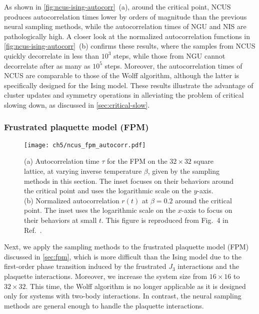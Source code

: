 As shown in \cref{fig:ncus-ising-autocorr}~(a), around the critical point, NCUS produces autocorrelation times lower by orders of magnitude than the previous neural sampling methods, while the autocorrelation times of NGU and NIS are pathologically high. A closer look at the normalized autocorrelation functions in \cref{fig:ncus-ising-autocorr}~(b) confirms these results, where the samples from NCUS quickly decorrelate in less than $10^3$ steps, while those from NGU cannot decorrelate after as many as $10^5$ steps. Moreover, the autocorrelation times of NCUS are comparable to those of the Wolff algorithm, although the latter is specifically designed for the Ising model. These results illustrate the advantage of cluster updates and symmetry operations in alleviating the problem of critical slowing down, as discussed in \cref{sec:critical-slow}.

\subsubsection{Frustrated plaquette model (FPM)}
\label{sec:ncus-fpm}

\begin{figure}[htb]
\centering
\texttt{[image: ch5/ncus\_fpm\_autocorr.pdf]}
\caption[NCUS results of FPM]{
(a) Autocorrelation time $\tau$ for the FPM on the $32 \times 32$ square lattice, at varying inverse temperature $\beta$, given by the sampling methods in this section.
The inset focuses on their behaviors around the critical point and uses the logarithmic scale on the $y$-axis. \\
(b) Normalized autocorrelation $r(t)$ at $\beta = 0.2$ around the critical point.
The inset uses the logarithmic scale on the $x$-axis to focus on their behaviors at small $t$.
This figure is reproduced from Fig.~4 in Ref.~\cite{wu2021unbiased}.
}
\label{fig:ncus-fpm-autocorr}
\end{figure}

Next, we apply the sampling methods to the frustrated plaquette model (FPM) discussed in \cref{sec:fpm}, which is more difficult than the Ising model due to the first-order phase transition induced by the frustrated $J_3$ interactions and the plaquette interactions. Moreover, we increase the system size from $16 \times 16$ to $32 \times 32$. This time, the Wolff algorithm is no longer applicable as it is designed only for systems with two-body interactions. In contrast, the neural sampling methods are general enough to handle the plaquette interactions.

